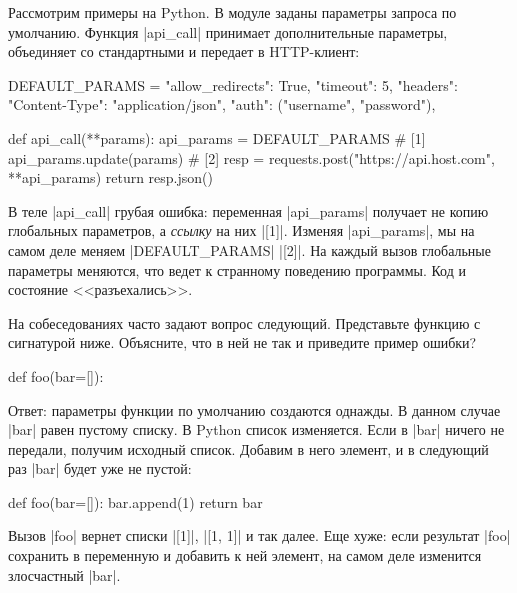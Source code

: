 Рассмотрим примеры на Python. В модуле заданы параметры запроса по
умолчанию. Функция \spverb|api_call| принимает дополнительные параметры,
объединяет со стандартными и передает в HTTP-клиент:

\begin{english}
  \begin{python}
DEFAULT_PARAMS = {
    "allow_redirects": True,
    "timeout": 5,
    "headers": {"Content-Type": "application/json"},
    "auth": ("username", "password"),
}

def api_call(**params):
    api_params = DEFAULT_PARAMS # [1]
    api_params.update(params)   # [2]
    resp = requests.post("https://api.host.com", **api_params)
    return resp.json()
  \end{python}
\end{english}

В теле \spverb|api_call| грубая ошибка: переменная \spverb|api_params| получает
не копию глобальных параметров, а \emph{ссылку} на них \spverb|[1]|. Изменяя
\spverb|api_params|, мы на самом деле меняем \spverb|DEFAULT_PARAMS|
\spverb|[2]|. На каждый вызов глобальные параметры меняются, что ведет к
странному поведению программы. Код и состояние <<разъехались>>.

На собеседованиях часто задают вопрос следующий. Представьте функцию с
сигнатурой ниже. Объясните, что в ней не так и приведите пример ошибки?

\begin{english}
  \begin{python}
def foo(bar=[]):
  \end{python}
\end{english}

Ответ: параметры функции по умолчанию создаются однажды. В данном случае
\spverb|bar| равен пустому списку. В Python список изменяется. Если в
\spverb|bar| ничего не передали, получим исходный список. Добавим в него
элемент, и в следующий раз \spverb|bar| будет уже не пустой:

\begin{english}
  \begin{python}
def foo(bar=[]):
    bar.append(1)
    return bar
  \end{python}
\end{english}

Вызов \spverb|foo| вернет списки \spverb|[1]|, \spverb|[1, 1]| и так далее. Еще
хуже: если результат \spverb|foo| сохранить в переменную и добавить к ней
элемент, на самом деле изменится злосчастный \spverb|bar|.

